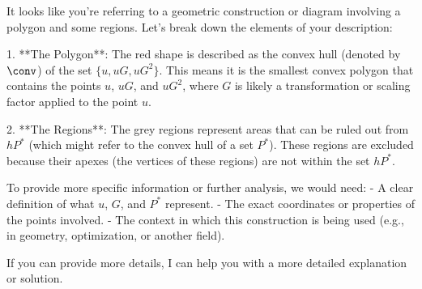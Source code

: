 It looks like you're referring to a geometric construction or diagram involving a polygon and some regions. Let's break down the elements of your description:

1. **The Polygon**: The red shape is described as the convex hull (denoted by $\conv$) of the set $\{u, uG, uG^2\}$. This means it is the smallest convex polygon that contains the points $u$, $uG$, and $uG^2$, where $G$ is likely a transformation or scaling factor applied to the point $u$. 

2. **The Regions**: The grey regions represent areas that can be ruled out from $hP^*$ (which might refer to the convex hull of a set $P^*$). These regions are excluded because their apexes (the vertices of these regions) are not within the set $hP^*$.

To provide more specific information or further analysis, we would need:
- A clear definition of what $u$, $G$, and $P^*$ represent.
- The exact coordinates or properties of the points involved.
- The context in which this construction is being used (e.g., in geometry, optimization, or another field).

If you can provide more details, I can help you with a more detailed explanation or solution.
